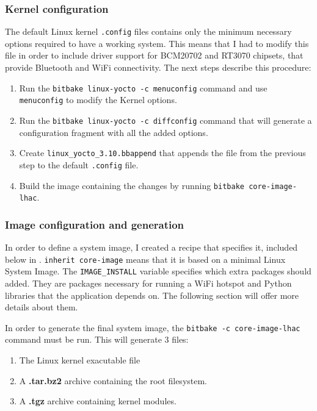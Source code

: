 \subsubsection{Kernel configuration}

The default Linux kernel \texttt{.config} files contains only the minimum necessary options required to have a working system. This means that I had to modify this file in order to include driver support for BCM20702 and RT3070 chipsets, that provide Bluetooth and WiFi connectivity. The next steps describe this procedure:
\begin{enumerate}
  \item Run the \texttt{bitbake linux-yocto -c menuconfig} command and use \texttt{menuconfig} to modify the Kernel options.
  \item Run the \texttt{bitbake linux-yocto -c diffconfig} command that will generate a configuration fragment with all the added options.
  \item Create \texttt{linux_yocto_3.10.bbappend} that appends the file from the previous step to the default \texttt{.config} file.
  \item Build the image containing the changes by running \texttt{bitbake core-image-lhac}.
\end{enumerate}

\subsubsection{Image configuration and generation}

In order to define a system image, I created a recipe that specifies it, included below in . \texttt{inherit core-image} means that it is based on a minimal Linux System Image. The \texttt{IMAGE_INSTALL} variable specifies which extra packages should added. They are packages necessary for running a WiFi hotspot and Python libraries that the application depends on. The following section will offer more details about them.

\lstset{caption=core-image-lhac.bb Recipe for Generating a Linux System Image, label=lst:lhac-recipe}


In order to generate the final system image, the \texttt{bitbake -c core-image-lhac} command must be run. This will generate 3 files:
\begin{enumerate}
  \item The Linux kernel exacutable file
  \item A \textbf{.tar.bz2} archive containing the root filesystem.
  \item A \textbf{.tgz} archive containing kernel modules.
\end{enumerate}

